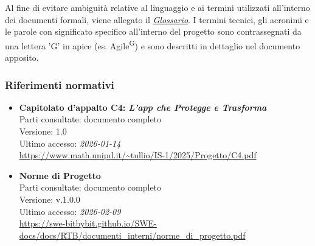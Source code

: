 \documentclass[a4paper,12pt]{article}
\begin{document}

Al fine di evitare ambiguità relative al linguaggio e ai termini utilizzati all'interno dei documenti formali, viene allegato il \href{https://swe-bitbybit.github.io/SWE-docs/docs/RTB/documenti_interni/Glossario.pdf}{\textit{Glossario}}.
I termini tecnici, gli acronimi e le parole con significato specifico all'interno del progetto sono contrassegnati da una lettera 'G' in apice (es. Agile\textsuperscript{G}) e sono descritti in dettaglio nel documento apposito.

\subsubsection{Riferimenti normativi}\label{sec:riferimenti_normativi}
\begin{itemize}
\item \textbf{Capitolato d'appalto C4: \emph{L'app che Protegge e Trasforma}}\\
Parti consultate: documento completo\\
Versione: 1.0\\
Ultimo accesso: \textit{2026-01-14}\\
\url{https://www.math.unipd.it/~tullio/IS-1/2025/Progetto/C4.pdf}

\pagebreak %

\item \textbf{Norme di Progetto}\\
Parti consultate: documento completo\\
Versione: v.1.0.0\\
Ultimo accesso: \textit{2026-02-09}\\
\url{https://swe-bitbybit.github.io/SWE-docs/docs/RTB/documenti_interni/norme_di_progetto.pdf} %
\end{itemize}
\end{document}
